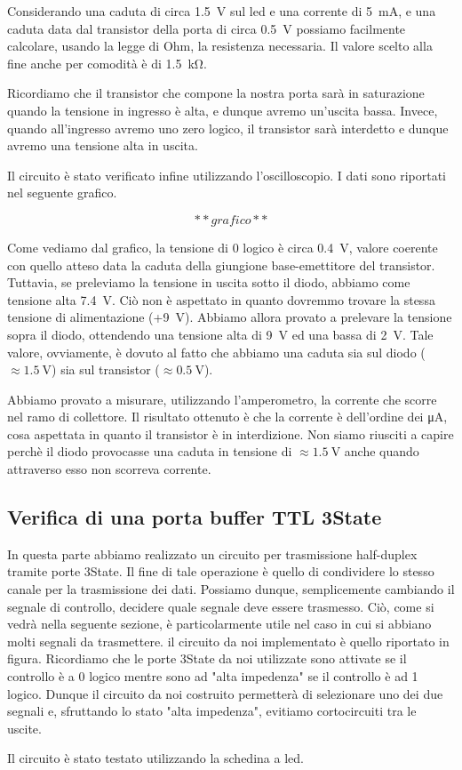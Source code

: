 Considerando una caduta di circa \SI{1.5}{\volt} sul led e una corrente di \SI{5}{\milli\ampere}, e una caduta data dal transistor della porta di circa \SI{0.5}{\volt} possiamo facilmente calcolare, usando la legge di Ohm, la resistenza necessaria. Il valore scelto alla fine anche per comodità è di \SI{1.5}{\kilo\ohm}.

Ricordiamo che il transistor che compone la nostra porta sarà in saturazione quando la tensione in ingresso è alta, e dunque avremo un'uscita bassa. Invece, quando all'ingresso avremo uno zero logico, il transistor sarà interdetto e dunque avremo una tensione alta in uscita. 

Il circuito è stato verificato infine utilizzando l'oscilloscopio. I dati sono riportati nel seguente grafico. 

$$**grafico**$$

Come vediamo dal grafico, la tensione di 0 logico è circa \SI{0.4}{\volt}, valore coerente con quello atteso data la caduta della giungione base-emettitore del transistor. Tuttavia, se preleviamo la tensione in uscita sotto il diodo, abbiamo come tensione alta \SI{7.4}{\volt}. Ciò non è aspettato in quanto dovremmo trovare la stessa tensione di alimentazione (+\SI{9}{\volt}). Abbiamo allora provato a prelevare la tensione sopra il diodo, ottendendo una tensione alta di \SI{9}{\volt} ed una bassa di \SI{2}{\volt}. Tale valore, ovviamente, è dovuto al fatto che abbiamo una caduta sia sul diodo ($\approx \SI{1.5}{\volt}$) sia sul transistor ($\approx \SI{0.5}{\volt}$). 

Abbiamo provato a misurare, utilizzando l'amperometro, la corrente che scorre nel ramo di collettore. Il risultato ottenuto è che la corrente è dell'ordine dei \si{\micro\ampere}, cosa aspettata  in quanto il transistor è in interdizione. Non siamo riusciti a capire perchè il diodo provocasse una caduta in tensione di $\approx \SI{1.5}{\volt}$ anche quando attraverso esso non scorreva corrente. 


\subsection*{Verifica di una porta buffer TTL 3State}

In questa parte abbiamo realizzato un circuito per trasmissione half-duplex tramite porte 3State. Il fine di tale operazione è quello di condividere lo stesso canale per la trasmissione dei dati. Possiamo dunque, semplicemente cambiando il segnale di controllo, decidere quale segnale deve essere trasmesso. Ciò, come si vedrà nella seguente sezione, è particolarmente utile nel caso in cui si abbiano molti segnali da trasmettere. il circuito da noi implementato è quello riportato in figura. Ricordiamo che le porte 3State da noi utilizzate sono attivate se il controllo è a 0 logico mentre sono ad "alta impedenza" se il controllo è ad 1 logico. Dunque il circuito da noi costruito permetterà di selezionare uno dei due segnali e, sfruttando lo stato "alta impedenza", evitiamo cortocircuiti tra le uscite. 

Il circuito è stato testato utilizzando la schedina a led.
















